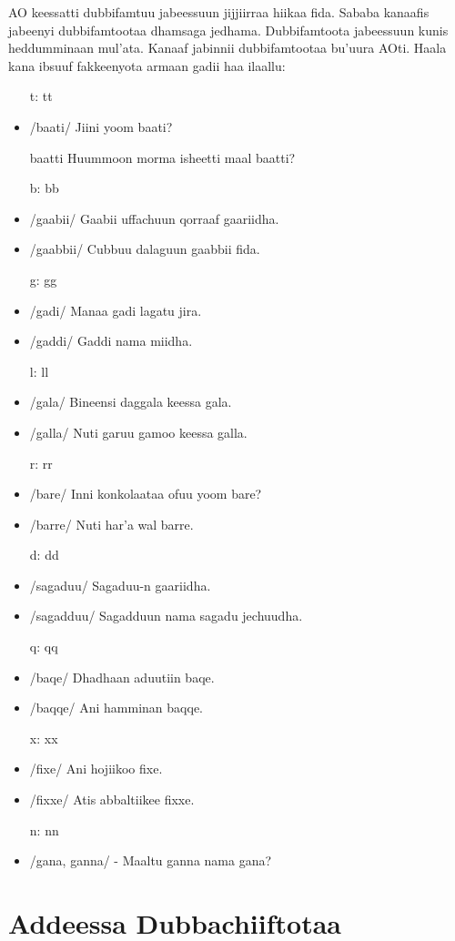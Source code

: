 \documentclass[11pt,b5paper]{book}
\begin{document}
\begin{itemize}
AO keessatti dubbifamtuu jabeessuun jijjiirraa hiikaa fida.  Sababa kanaafis jabeenyi dubbifamtootaa dhamsaga jedhama.  Dubbifamtoota jabeessuun kunis heddumminaan mul’ata.  Kanaaf jabinnii dubbifamtootaa bu’uura AOti. Haala kana  ibsuuf fakkeenyota armaan gadii haa ilaallu: 
\begin{itemize}
        \item[t: tt]
        \item/baati/ Jiini yoom baati?
        \item[baatti] Huummoon morma isheetti maal baatti?
        \item[b: bb]
        \item/gaabii/ Gaabii uffachuun qorraaf gaariidha. 
        \item/gaabbii/ Cubbuu dalaguun gaabbii fida. 
        \item[g: gg]
        \item/gadi/ Manaa gadi lagatu jira. 
        \item/gaddi/ Gaddi nama miidha.
        \item[l: ll] 
        \item/gala/ Bineensi daggala keessa gala. 
        \item/galla/ Nuti garuu gamoo keessa galla. 
        \item[r: rr]
        \item/bare/ Inni konkolaataa ofuu yoom bare? 
        \item/barre/ Nuti har’a wal barre.
        \item[d: dd]
        \item/sagaduu/ Sagaduu-n gaariidha.
        \item/sagadduu/ Sagadduun nama sagadu jechuudha. 
        \item[q: qq]
        \item/baqe/  Dhadhaan aduutiin baqe.
        \item/baqqe/ Ani hamminan baqqe.
        \item[x: xx] 
        \item/fixe/ Ani hojiikoo fixe.
        \item/fixxe/ Atis abbaltiikee fixxe. 
        \item[n: nn]
        \item/gana, ganna/ - Maaltu ganna nama gana?
\end{itemize}

\section{Addeessa Dubbachiiftotaa}


\end{itemize}
\end{document}
